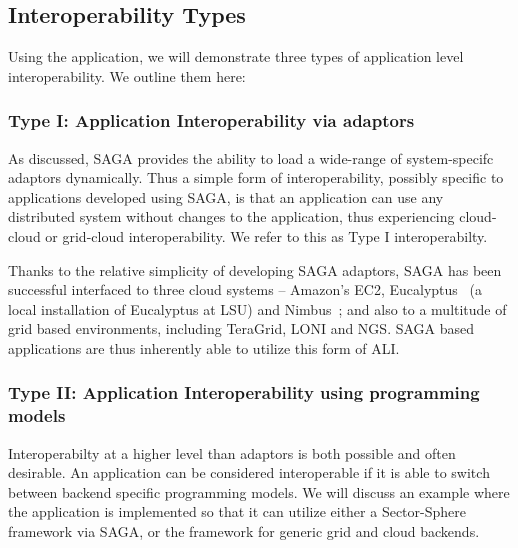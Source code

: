 \documentclass[3p,twocolumn]{elsarticle}
\begin{document}
\subsection{Interoperability Types}

Using the \wc application, we will demonstrate three types of
application level interoperability. We outline them here:


\subsubsection{Type I: Application Interoperability via adaptors}
%
%

As discussed, SAGA provides the ability to load a wide-range of
system-specifc adaptors dynamically. Thus a simple form of
interoperability, possibly specific to applications developed using
SAGA, is that an application can use any distributed system without
changes to the application, thus experiencing cloud-cloud or
grid-cloud interoperability.  We refer to this as Type I
interoperabilty.


Thanks to the relative simplicity of developing SAGA adaptors, SAGA
has been successful interfaced to three cloud systems -- Amazon's EC2,
Eucalyptus~\cite{eucalyptus} (a local installation of Eucalyptus at
LSU) and Nimbus~\cite{nimbus}; and also to a multitude of grid based
environments, including TeraGrid, LONI and NGS.  SAGA based
applications are thus inherently able to utilize this form of ALI.

\subsubsection{Type II: Application Interoperability using programming
  models} %
%
%

Interoperabilty at a higher level than adaptors is both possible and
often desirable. An application can be considered interoperable if it
is able to switch between backend specific programming models.  We
will discuss an example where the \wc application is implemented so
that it can utilize either a Sector-Sphere framework via SAGA, or the
\smr framework for generic grid and cloud backends. 
\end{document}
